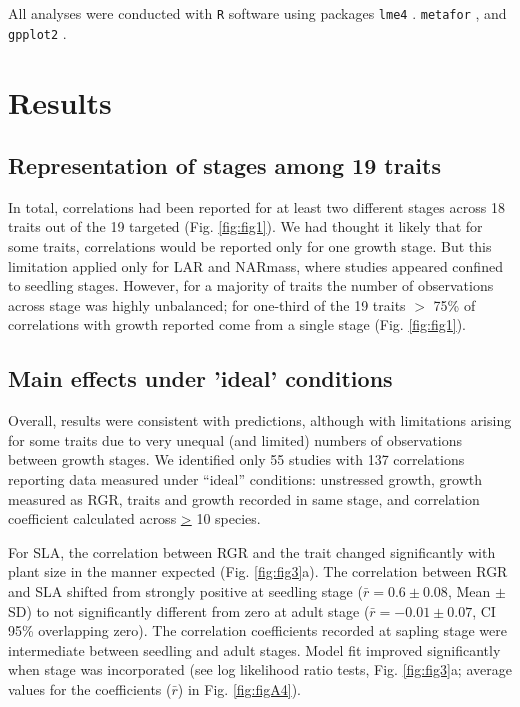 \documentclass[a4paper,11pt]{article}
\begin{document}
All analyses were conducted with \texttt{R} software \citep{Ralanguageanden:2014wf} using packages \texttt{lme4} \citep{Bates-2014}. \texttt{metafor} \citep{Viechtbauer-2010}, and \texttt{gpplot2} \citep{Wickham:2009}.


\section*{Results}\label{results}

\subsection*{Representation of stages among 19 traits}
In total, correlations had been reported for at least two different stages across 18 traits out of the 19 targeted (Fig. \ref{fig:fig1}). We had thought it likely that for some traits, correlations would be reported only for one growth stage. But this limitation applied only for LAR and NARmass, where studies appeared confined to seedling stages. However, for a majority of traits the number of observations across stage was highly unbalanced; for one-third of the 19 traits $>$ 75\% of correlations with growth reported come from a single stage (Fig. \ref{fig:fig1}).

\subsection*{Main effects under 'ideal' conditions}

Overall, results were consistent with predictions, although with limitations arising for some traits due to very unequal (and limited) numbers of observations between growth stages. We identified only 55 studies with 137 correlations reporting data measured under ``ideal'' conditions: unstressed growth, growth measured as RGR, traits and growth recorded in same stage, and correlation coefficient calculated across \underline{\textgreater} 10 species. 

For SLA, the correlation between RGR and the trait changed significantly with plant size in the manner expected (Fig. \ref{fig:fig3}a). The correlation between RGR and SLA shifted from strongly positive at seedling stage ($\bar{r}=0.6 \pm 0.08$, Mean $\pm$ SD) to not significantly different from zero at adult stage ($\bar{r}= -0.01 \pm 0.07$, CI 95\% overlapping zero). The correlation coefficients recorded at sapling stage were intermediate between seedling and adult stages. Model fit improved significantly when stage was incorporated (see log likelihood ratio tests, Fig. \ref{fig:fig3}a; average values for the coefficients ($\bar{r}$) in Fig. \ref{fig:figA4}).
\end{document}
